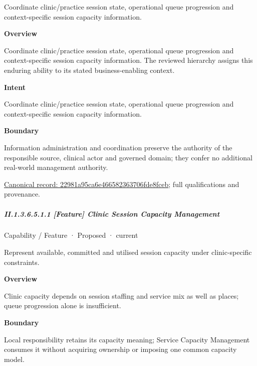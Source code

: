 Coordinate clinic/practice session state, operational queue progression and context-specific session capacity information.



\textbf{Overview}



Coordinate clinic/practice session state, operational queue progression and context-specific session capacity information. The reviewed hierarchy assigns this enduring ability to its stated business-enabling context.



\textbf{Intent}



Coordinate clinic/practice session state, operational queue progression and context-specific session capacity information.



\textbf{Boundary}



Information administration and coordination preserve the authority of the responsible source, clinical actor and governed domain; they confer no additional real-world management authority.


{\footnotesize \href{../../../../continuum/strategy/capability/22981a95ca6e466582363706fde8fceb.md}{Canonical record: 22981a95ca6e466582363706fde8fceb}; full qualifications and provenance.}\par
\subparagraph*{II.1.3.6.5.1.1 [Feature] Clinic Session Capacity Management}
\label{navigation:II.1.3.6.5.1.1}

\label{element:02bdd6a6f22e47f5a29d722ab57f9915}
{\small Capability / Feature · Proposed · current}\par

Represent available, committed and utilised session capacity under clinic-specific constraints.



\textbf{Overview}



Clinic capacity depends on session staffing and service mix as well as places; queue progression alone is insufficient.



\textbf{Boundary}



Local responsibility retains its capacity meaning; Service Capacity Management consumes it without acquiring ownership or imposing one common capacity model.


